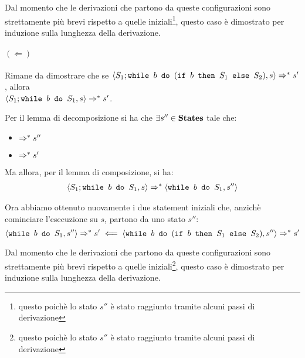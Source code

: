 Dal momento che le derivazioni che partono da queste configurazioni sono
strettamente più brevi rispetto a quelle iniziali\footnote{questo poichè lo
stato $s''$ è stato raggiunto tramite alcuni passi di derivazione}, questo
caso è dimostrato per induzione sulla lunghezza della derivazione.

\paragraph{$(\Leftarrow)$}

Rimane da dimostrare che se
$\confSs{S_1; \wbS{b}{(\ifABC{b}{S_1}{S_2})}}{s} \Rar{*} s'$, allora \\
$\confSs{S_1; \wbS{b}{S_1}}{s} \Rar{*} s'$.

Per il lemma di decomposizione si ha che $\exists s'' \in \states$ tale che:
\begin{itemize}
  \item {} $\Rar{*} s''$
  \item {} $\Rar{*} s'$
\end{itemize}

Ma allora, per il lemma di composizione, si ha:
\begin{align*}
\confSs{S_1; \wbS{b}{S_1}}{s}
\Rar{*}
\confSs{\wbS{b}{S_1}}{s''}
\end{align*}

Ora abbiamo ottenuto nuovamente i due statement iniziali che, anzichè
cominciare l'esecuzione su $s$, partono da uno stato $s''$:
$$
\confSs{\wbS{b}{S_1}}{s''} \Rar{*} s'
  \impliedby
\confSs{\wbS{b}{(\ifABC{b}{S_1}{S_2})}}{s''} \Rar{*} s'
$$

Dal momento che le derivazioni che partono da queste configurazioni sono
strettamente più brevi rispetto a quelle iniziali\footnote{questo poichè lo
stato $s''$ è stato raggiunto tramite alcuni passi di derivazione}, questo
caso è dimostrato per induzione sulla lunghezza della derivazione.

\cvd


